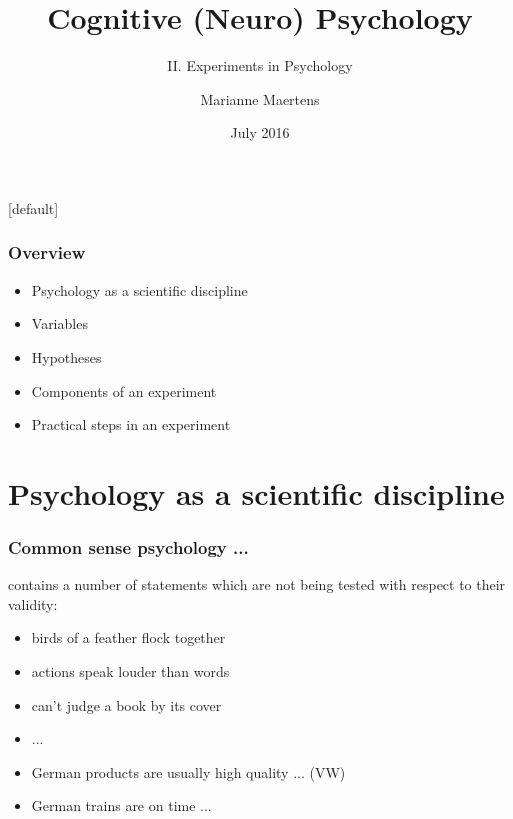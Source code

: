 \documentclass[]{beamer}
\title{ Cognitive (Neuro) Psychology }
\subtitle{II. Experiments in Psychology}
\author{ Marianne Maertens }
\institute[TU Berlin]{Technische Universit\"at Berlin}
\date{July 2016}
\begin{document}
[default]

\frame{\titlepage}



\begin{frame}
 \frametitle{Overview}
 \begin{itemize}
  \item Psychology as a scientific discipline
  \item Variables
  \item Hypotheses
  \item Components of an experiment
  \item Practical steps in an experiment
 \end{itemize}
\end{frame}




\section{Psychology as a scientific discipline}
\begin{frame}
 \frametitle{Common sense psychology ...}
contains a number of statements which are not being tested with respect to their validity:\\

  \begin{itemize}
   \item birds of a feather flock together
   \item actions speak louder than words
   \item can't judge a book by its cover
   \item ... 
   \item German products are usually high quality ... (VW)
   \item German trains are on time ...
  \end{itemize}
\end{frame}
\end{document}
